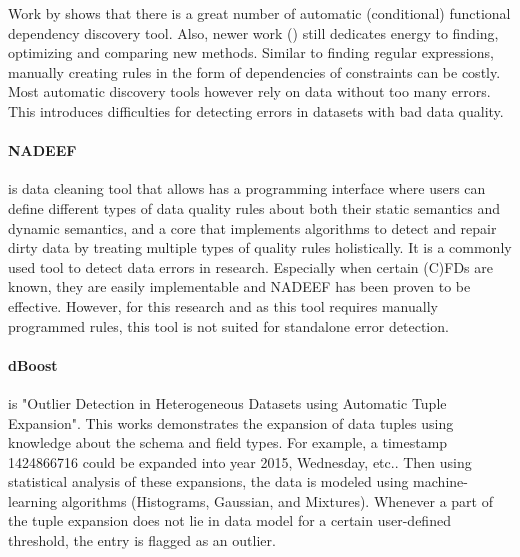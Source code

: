 Work by \cite{Asghar2015-yq} shows that there is a great number of automatic (conditional) functional dependency discovery tool. Also, newer work (\cite{Rammelaere2019-ps}) still dedicates energy to finding, optimizing and comparing new methods. Similar to finding regular expressions, manually creating rules in the form of dependencies of constraints can be costly. Most automatic discovery tools however rely on data without too many errors. This introduces difficulties for detecting errors in datasets with bad data quality. 

\paragraph{NADEEF \cite{Dallachiesa2013-he}} is data cleaning tool that allows has a programming interface where users can define different types of data quality rules about both their static semantics and dynamic semantics, and a core that implements algorithms to detect and repair dirty data by treating multiple types of quality rules holistically. It is a commonly used tool to detect data errors in research. Especially when certain (C)FDs are known, they are easily implementable and NADEEF has been proven to be effective. However, for this research and as this tool requires manually programmed rules, this tool is not suited for standalone error detection.


\paragraph{dBoost \cite{Pit--Claudel2016-dj}} is "Outlier Detection in Heterogeneous Datasets using Automatic Tuple Expansion". This works demonstrates the expansion of data tuples using knowledge about the schema and field types. For example, a timestamp 1424866716 could be expanded into year 2015, Wednesday, etc.. Then using statistical analysis of these expansions, the data is modeled using machine-learning algorithms (Histograms, Gaussian, and Mixtures). Whenever a part of the tuple expansion does not lie in data model for a certain user-defined threshold, the entry is flagged as an outlier.



